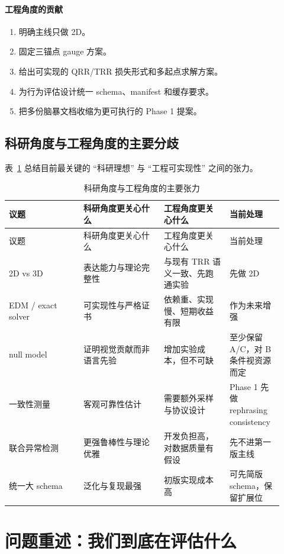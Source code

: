 \documentclass[11pt,a4paper]{ctexart}
\begin{document}
\paragraph{工程角度的贡献}
\begin{enumerate}[label=\arabic*.]
  \item 明确主线只做 2D。
  \item 固定三锚点 gauge 方案。
  \item 给出可实现的 QRR/TRR 损失形式和多起点求解方案。
  \item 为行为评估设计统一 schema、manifest 和缓存要求。
  \item 把多份脑暴文档收缩为更可执行的 Phase 1 提案。
\end{enumerate}

\subsection{科研角度与工程角度的主要分歧}

表~\ref{tab:research-engineering-tension} 总结目前最关键的 ``科研理想'' 与 ``工程可实现性'' 之间的张力。

\begin{longtable}{p{0.25\linewidth}p{0.27\linewidth}p{0.22\linewidth}p{0.18\linewidth}}
\caption{科研角度与工程角度的主要张力}\label{tab:research-engineering-tension}\\
\toprule
议题 & 科研角度更关心什么 & 工程角度更关心什么 & 当前处理 \\
\midrule
\endfirsthead
\toprule
议题 & 科研角度更关心什么 & 工程角度更关心什么 & 当前处理 \\
\midrule
\endhead
2D vs 3D & 表达能力与理论完整性 & 与现有 TRR 语义一致、先跑通实验 & 先做 2D \\
EDM / exact solver & 可实现性与严格证书 & 依赖重、实现慢、短期收益有限 & 作为未来增强 \\
null model & 证明视觉贡献而非语言先验 & 增加实验成本，但不可缺 & 至少保留 A/C，对 B 条件视资源而定 \\
一致性测量 & 客观可靠性估计 & 需要额外采样与协议设计 & Phase 1 先做 rephrasing consistency \\
联合异常检测 & 更强鲁棒性与理论优雅 & 开发负担高，对数据质量有假设 & 先不进第一版主线 \\
统一大 schema & 泛化与复现最强 & 初版实现成本高 & 可先简版 schema，保留扩展位 \\
\bottomrule
\end{longtable}

\section{问题重述：我们到底在评估什么}
\end{document}
